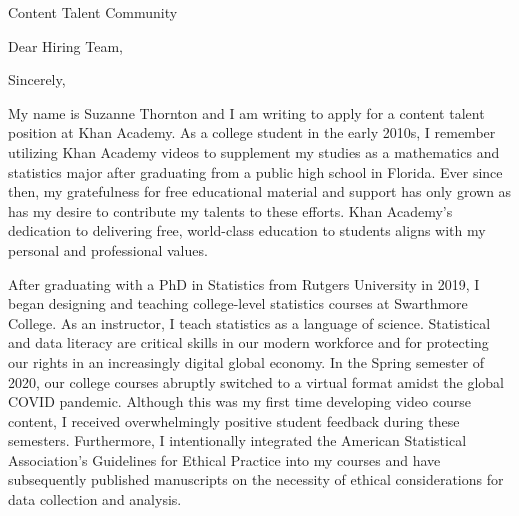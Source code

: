 \documentclass[11pt,a4paper,sans]{moderncv}
\begin{document}
	
	{Content Talent Community}
	\date{\today }
	\opening{Dear Hiring Team,}
	\closing{Sincerely,}
	\makelettertitle
	
	
	My name is Suzanne Thornton and I am writing to apply for a content talent position at Khan Academy. As a college student in the early 2010s, I remember utilizing Khan Academy videos to supplement my studies as a mathematics and statistics major after graduating from a public high school in Florida. Ever since then, my gratefulness for free educational material and support has only grown as has my desire to contribute my talents to these efforts. Khan Academy's dedication to delivering free, world-class education to students aligns with my personal and professional values. %
	
	After graduating with a PhD in Statistics from Rutgers University in 2019, I began designing and teaching college-level statistics courses at Swarthmore College. As an instructor, I teach statistics as a language of science. Statistical and data literacy are critical skills in our modern workforce and for protecting our rights in an increasingly digital global economy. In the Spring semester of 2020, our college courses abruptly switched to a virtual format amidst the global COVID pandemic. Although this was my first time developing video course content, I received overwhelmingly positive student feedback during these semesters. Furthermore, I intentionally integrated the American Statistical Association's Guidelines for Ethical Practice into my courses and have subsequently published manuscripts on the necessity of ethical considerations for data collection and analysis. 
	
\end{document}

